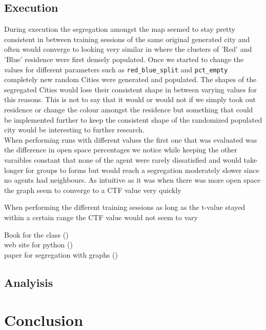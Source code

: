 \documentclass[letterpaper]{article}
\begin{document}
\subsection{Execution}

During execution the segregation amongst the map seemed to stay pretty consistent in between training sessions of the same original generated city and often would converge to looking very similar in where the clusters of 'Red' and 'Blue' residence were first densely populated.  Once we started to change the values for different parameters such as \texttt{red\_blue\_split} and \texttt{pct\_empty} completely new random Cities were generated and populated. The shapes of the segregated Cities would lose their consistent shape in between varying values for this reasons.  This is not to say that it would or would not if we simply took out residence or change the colour amongst the residence but something that could be implemented further to keep the consistent shape of the randomized populated city would be interesting to further research.\\
When performing runs with different values the first one that was evaluated was the difference in open space percentages we notice while keeping the other varaibles constant that none of the agent were rarely dissatisfied and would take longer for groups to forms but would reach a segregation moderately slower since no agents had neighbours.  As intuitive as it was when there was more open space the graph seem to converge to a CTF value very quickly 

When performing the different training sessions as long as the t-value stayed within a certain range the CTF value would not seem to vary 

Book for the class  (\cite{10.5555/1805895})\\
web site for python (\cite{AdilMoujahid})\\
paper for segregation with graphs (\cite{ijcai2019-38})\\



\subsection{Analyisis}
 
\section{Conclusion}



\end{document}
